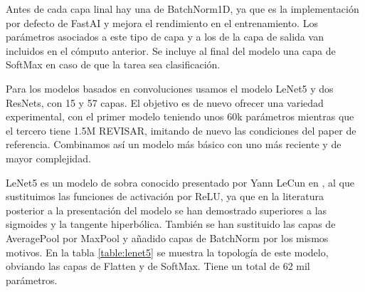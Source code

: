 Antes de cada capa linal hay una de BatchNorm1D, ya que es la implementación por defecto de FastAI y mejora el rendimiento en el entrenamiento. Los parámetros asociados a este tipo de capa y a los de la capa de salida van incluidos en el cómputo anterior. Se incluye al final del modelo una capa de SoftMax en caso de que la tarea sea clasificación.

Para los modelos basados en convoluciones usamos el modelo LeNet5 y dos ResNets, con 15 y 57 capas. El objetivo es de nuevo ofrecer una variedad experimental, con el primer modelo teniendo unos 60k parámetros mientras que el tercero tiene 1.5M REVISAR, imitando de nuevo las condiciones del paper de referencia. Combinamos así un modelo más básico con uno más reciente y de mayor complejidad.


LeNet5 es un modelo de sobra conocido presentado por Yann LeCun en \cite{lenet5}, al que sustituimos las funciones de activación por ReLU, ya que en la literatura posterior a la presentación del modelo se han demostrado superiores a las sigmoides y la tangente hiperbólica. También se han sustituido las capas de AveragePool por MaxPool y añadido capas de BatchNorm por los mismos motivos. En la tabla \ref{table:lenet5} se muestra la topología de este modelo, obviando las capas de Flatten y de SoftMax. Tiene un total de 62 mil parámetros.



